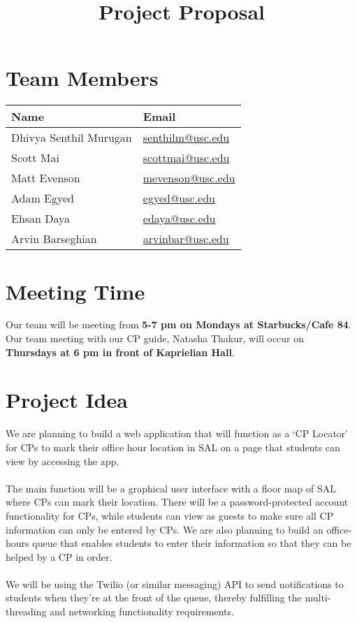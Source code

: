 \documentclass{article}
\title{Project Proposal}
\date{\vspace{-10ex}}
\begin{document}
\maketitle

\section*{Team Members}

\begin{center}
\begin{tabular}{ | l | l | }
\hline
\textbf{Name} & \textbf{Email} \\
\hline
Dhivya Senthil Murugan & \href{mailto:senthilm@usc.edu}{senthilm@usc.edu} \\
\hline
Scott Mai & \href{mailto:scottmai@usc.edu}{scottmai@usc.edu} \\
\hline
Matt Evenson & \href{mailto:mevenson@usc.edu}{mevenson@usc.edu} \\
\hline
Adam Egyed & \href{mailto:egyed@usc.edu}{egyed@usc.edu} \\
\hline
Ehsan Daya & \href{mailto:edaya@usc.edu}{edaya@usc.edu} \\
\hline
Arvin Barseghian & \href{mailto:arvinbar@usc.edu}{arvinbar@usc.edu} \\
\hline
\end{tabular}
\end{center}

\section*{Meeting Time}

Our team will be meeting from \textbf{5-7 pm on Mondays at Starbucks/Cafe 84}.
Our team meeting with our CP guide, Natasha Thakur, will occur on \textbf{Thursdays at 6 pm in front of Kaprielian Hall}.

\section*{Project Idea}

We are planning to build a web application that will function as a ‘CP Locator’ for CPs to mark
their office hour location in SAL on a page that students can view by accessing the app.
\\ \\
The main function will be a graphical user interface with a floor map of SAL where CPs
can mark their location. There will be a password-protected account functionality for CPs,
while students can view as guests to make sure all CP information can only be entered by CPs.
We are also planning to build an office-hours queue that enables students to enter their information so
that they can be helped by a CP in order.
\\ \\
We will be using the Twilio (or similar messaging) API to send
notifications to students when they’re at the front of the queue, thereby fulfilling the multi-threading and
networking functionality requirements.
\end{document}
